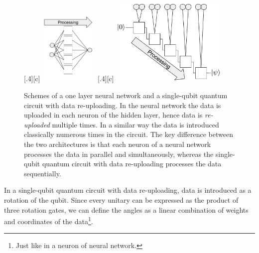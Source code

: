 \begin{figure}[bp]
    \centering
    [.4\textwidth][c]{
        \includegraphics[width=0.25\textwidth]{sections/chapters/Quantum-Machine-Learning/Images/Neural_network.png}
        }
    [.4\textwidth][c]{
        \includegraphics[width=0.5\textwidth]{sections/chapters/Quantum-Machine-Learning/Images/Quantum_scheme.png}
        }
    \caption{
        Schemes of a one layer neural network and a single-qubit quantum circuit with data re-uploading.
        In the neural network the data is uploaded in each neuron of the hidden layer, hence data is 
        \textit{re-uploaded} multiple times.
        In a similar way the data is introduced classically numerous times in the circuit.
        The key difference between the two architectures is that each neuron of a neural network processes the 
        data in parallel and simultaneously, whereas the single-qubit quantum circuit with data re-uploading 
        processes the data sequentially.}
\label{Fig:schemes}
\end{figure}

In a single-qubit quantum circuit with data re-uploading, data is introduced as a rotation of the qubit.
Since every unitary can be expressed as the product of three rotation gates, we can define the angles as a linear
combination of weights and coordinates of the data\footnote[1]{Just like in a neuron of neural network.}.


